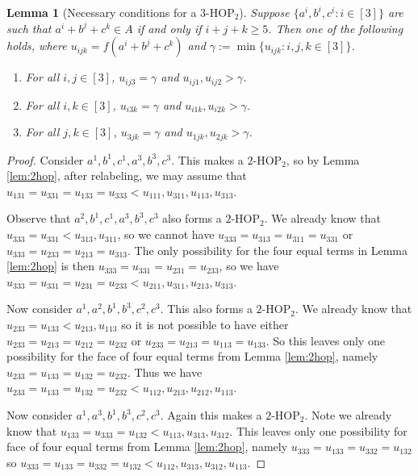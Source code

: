 \documentclass[12pt,oneside,british,a4wide]{amsart}
\newtheorem{lemma}[theorem]{Lemma}
\numberwithin{equation}{section}
\theoremstyle{definition}
\def\HOP{\mathrm{HOP}}
\begin{document}
\begin{lemma}[Necessary conditions for a $3$-$\HOP_2$]\label{lem:3hop}
Suppose $\{a^i,b^i,c^i: i\in [3]\}$ are such that $a^i+b^j+c^k\in A$ if and only if $i+j+k\geq 5$. Then one of the following holds, where $u_{ijk}=f(a^i+b^j+c^k)$ and $\gamma:=\min\{u_{ijk}: i,j,k\in [3]\}$.
\begin{enumerate}[label=\normalfont(\roman*)]
\item For all $i,j\in [3]$, $u_{ij3}=\gamma$ and $u_{ij1},u_{ij2}>\gamma$.
\item For all $i,k\in [3]$, $u_{i3k}=\gamma$ and $u_{i1k},u_{i2k}>\gamma$.
\item For all $j,k\in [3]$, $u_{3jk}=\gamma$ and $u_{1jk},u_{2jk}>\gamma$.
\end{enumerate}
\end{lemma}
\begin{proof}
Consider $a^1, b^1, c^1, a^3,b^3,c^3$.  This makes a $2$-$\HOP_2$, so by Lemma \ref{lem:2hop}, after relabeling, we may assume that $u_{131}=u_{331}=u_{133}=u_{333}<u_{111},u_{311},u_{113},u_{313}$. 




Observe that $a^2,b^1,c^1, a^3,b^3,c^3$ also forms a $2$-$\HOP_2$.  We already know that $u_{333}=u_{331}<u_{313}, u_{311}$, so we cannot have $u_{333}=u_{313}=u_{311}=u_{331}$ or $u_{333}=u_{233}=u_{213}=u_{313}$. The only possibility for the four equal terms in Lemma \ref{lem:2hop} is then $u_{333}=u_{331}=u_{231}=u_{233}$, so we have $u_{333}=u_{331}=u_{231}=u_{233}<u_{211},u_{311},u_{213},u_{313}$.





Now consider $a^1,a^2,b^1,b^3,c^2,c^3$.  This also forms a $2$-$\HOP_2$.  We already know that $u_{233}=u_{133}<u_{213}, u_{113}$ so it is not possible to have either $u_{233}=u_{213}=u_{212}=u_{232}$ or $u_{233}=u_{213}=u_{113}=u_{133}$.  So this leaves only one possibility for the face of four equal terms from Lemma \ref{lem:2hop}, namely $u_{233}=u_{133}=u_{132}=u_{232}$.  Thus we have $u_{233}=u_{133}=u_{132}=u_{232}<u_{112},u_{213},u_{212},u_{113}$.



Now consider $a^1,a^3,b^1,b^3,c^2,c^3$.  Again this makes a $2$-$\HOP_2$.  Note we already know that $u_{133}=u_{333}=u_{132}<u_{113},u_{313}, u_{312}$.  This leaves only one possibility for face of four equal terms from Lemma \ref{lem:2hop}, namely $u_{333}=u_{133}=u_{332}=u_{132}$ so $u_{333}=u_{133}=u_{332}=u_{132}<u_{112},u_{313},u_{312},u_{113}$.




\end{proof}
\end{document}
